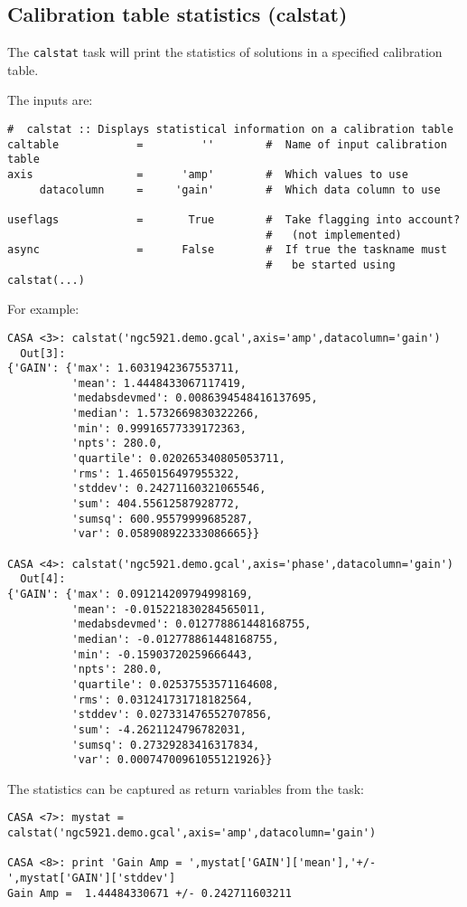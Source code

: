 \subsection{Calibration table statistics ({\rm calstat})}
\label{section:cal.tables.calstat}

The {\tt calstat} task will print the statistics of solutions in a specified 
calibration table.

The inputs are:
\small
\begin{verbatim}
#  calstat :: Displays statistical information on a calibration table
caltable            =         ''        #  Name of input calibration table
axis                =      'amp'        #  Which values to use
     datacolumn     =     'gain'        #  Which data column to use

useflags            =       True        #  Take flagging into account? 
                                        #   (not implemented)
async               =      False        #  If true the taskname must
                                        #   be started using calstat(...)
\end{verbatim}
\normalsize

For example:
\small
\begin{verbatim}
CASA <3>: calstat('ngc5921.demo.gcal',axis='amp',datacolumn='gain')
  Out[3]: 
{'GAIN': {'max': 1.6031942367553711,
          'mean': 1.4448433067117419,
          'medabsdevmed': 0.0086394548416137695,
          'median': 1.5732669830322266,
          'min': 0.99916577339172363,
          'npts': 280.0,
          'quartile': 0.020265340805053711,
          'rms': 1.4650156497955322,
          'stddev': 0.24271160321065546,
          'sum': 404.55612587928772,
          'sumsq': 600.95579999685287,
          'var': 0.058908922333086665}}

CASA <4>: calstat('ngc5921.demo.gcal',axis='phase',datacolumn='gain')
  Out[4]: 
{'GAIN': {'max': 0.091214209794998169,
          'mean': -0.015221830284565011,
          'medabsdevmed': 0.012778861448168755,
          'median': -0.012778861448168755,
          'min': -0.15903720259666443,
          'npts': 280.0,
          'quartile': 0.02537553571164608,
          'rms': 0.031241731718182564,
          'stddev': 0.027331476552707856,
          'sum': -4.2621124796782031,
          'sumsq': 0.27329283416317834,
          'var': 0.00074700961055121926}}
\end{verbatim}
\normalsize
The statistics can be captured as return variables from the task:
\small
\begin{verbatim}
CASA <7>: mystat = calstat('ngc5921.demo.gcal',axis='amp',datacolumn='gain')

CASA <8>: print 'Gain Amp = ',mystat['GAIN']['mean'],'+/-',mystat['GAIN']['stddev']
Gain Amp =  1.44484330671 +/- 0.242711603211
\end{verbatim}
\normalsize

